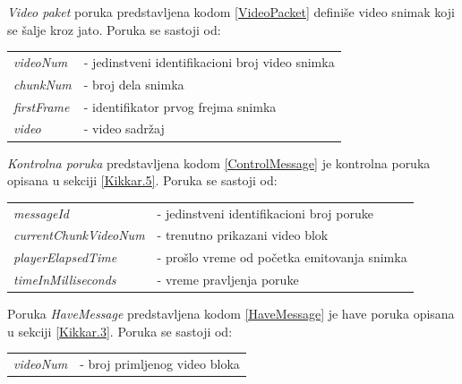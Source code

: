 \documentclass[12pt,oneside]{memoir}
\begin{document}
\textit{Video paket} poruka predstavljena kodom \ref{VideoPacket} definiše video snimak koji se šalje kroz jato. Poruka se sastoji od:
 
\begin{center}
\begin{tabular}{ p{4cm} p{10cm} }
 \textit{videoNum} & - jedinstveni identifikacioni broj video snimka \\ 
 \textit{chunkNum} & - broj dela snimka \\ 
 \textit{firstFrame} & - identifikator prvog frejma snimka \\ 
 \textit{video} & - video sadržaj \\ 
\end{tabular}
\end{center}




\textit{Kontrolna poruka} predstavljena kodom \ref{ControlMessage} je kontrolna poruka opisana u sekciji \ref{Kikkar.5}. Poruka se sastoji od:
 
\begin{center}
\begin{tabular}{ p{4.5cm} p{9.5cm} }
 \textit{messageId} & - jedinstveni identifikacioni broj poruke \\ 
 \textit{currentChunkVideoNum} & - trenutno prikazani video blok \\ 
 \textit{playerElapsedTime} & - prošlo vreme od početka emitovanja snimka \\ 
 \textit{timeInMilliseconds} & - vreme pravljenja poruke \\ 
\end{tabular}
\end{center}




Poruka \textit{HaveMessage} predstavljena kodom \ref{HaveMessage} je have poruka opisana u sekciji \ref{Kikkar.3}. Poruka se sastoji od:
 
\begin{center}
\begin{tabular}{ p{4.5cm} p{9.5cm} }
 \textit{videoNum} & - broj primljenog video bloka \\ 
\end{tabular}
\end{center}
\end{document}
